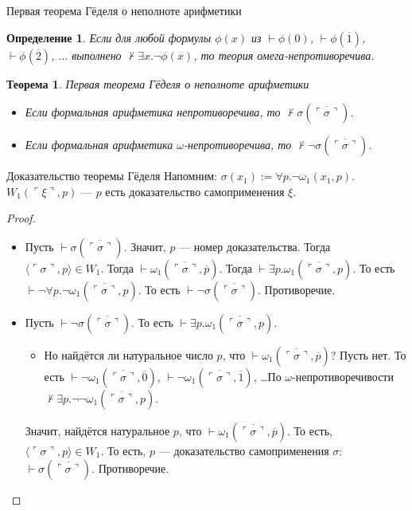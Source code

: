 \documentclass[aspectratio=169]{beamer}
\newtheorem{thm}{Теорема}[section]
\newtheorem{dfn}{Определение}[section]
\begin{document}
\begin{frame}{Первая теорема Гёделя о неполноте арифметики}
\begin{dfn}Если для любой формулы $\phi(x)$ из $\vdash\phi(0)$, $\vdash\phi(\overline{1})$,
$\vdash\phi(\overline{2})$, $\dots$ выполнено $\not\vdash\exists x.\neg\phi(x)$, 
то теория \emph{омега-непротиворечива}.
\end{dfn}

\begin{thm}{Первая теорема Гёделя о неполноте арифметики}
\begin{itemize}
\item Если формальная арифметика непротиворечива, то $\not\vdash\sigma(\overline{\ulcorner\sigma\urcorner})$.
\item Если формальная арифметика $\omega$-непротиворечива, то $\not\vdash\neg\sigma(\overline{\ulcorner\sigma\urcorner})$.
\end{itemize}
\end{thm}
\end{frame}

\begin{frame}{Доказательство теоремы Гёделя}
Напомним: $\sigma(x_1) := \forall p.\neg\omega_1(x_1,p)$. $W_1(\ulcorner\xi\urcorner,p)$ --- $p$ есть доказательство самоприменения $\xi$.
\begin{proof}
\begin{itemize}
\item Пусть $\vdash\sigma(\overline{\ulcorner\sigma\urcorner})$. Значит, $p$ --- номер доказательства. \pause Тогда
$\langle\ulcorner\sigma\urcorner,p\rangle \in W_1$. \pause Тогда $\vdash\omega_1(\overline{\ulcorner\sigma\urcorner},\overline{p})$. \pause 
Тогда $\vdash\exists p.\omega_1(\overline{\ulcorner\sigma\urcorner},p)$. \pause То есть
$\vdash\neg\forall p.\neg\omega_1(\overline{\ulcorner\sigma\urcorner},p)$. \pause То есть $\vdash\neg\sigma(\overline{\ulcorner\sigma\urcorner})$. Противоречие.
\pause
\item Пусть $\vdash\neg\sigma(\overline{\ulcorner\sigma\urcorner})$. \pause То есть $\vdash\exists p.\omega_1(\overline{\ulcorner\sigma\urcorner},p)$.
\begin{itemize}
\item
\pause Но найдётся ли натуральное число $p$, что $\vdash\omega_1(\overline{\ulcorner\sigma\urcorner},\overline{p})$?
\pause Пусть нет. То есть $\vdash\neg\omega_1(\overline{\ulcorner\sigma\urcorner},\overline{0})$,
                          $\vdash\neg\omega_1(\overline{\ulcorner\sigma\urcorner},\overline{1})$, 
                          \dots \pause По $\omega$-непротиворечивости $\not\vdash\exists p.\neg\neg\omega_1(\overline{\ulcorner\sigma\urcorner},p)$. \pause
\end{itemize}
       Значит, найдётся натуральное $p$, что $\vdash\omega_1(\overline{\ulcorner\sigma\urcorner},\overline{p})$. \pause 
То есть, $\langle\ulcorner\sigma\urcorner, p\rangle\in W_1$. \pause
То есть, $p$ --- доказательство самоприменения $\sigma$: $\vdash\sigma(\overline{\ulcorner\sigma\urcorner})$. \pause Противоречие.
\end{itemize}
\end{proof}
\end{frame}
\end{document}
